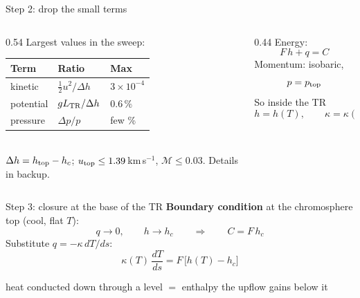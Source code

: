 \documentclass[aspectratio=169,10pt]{beamer}
\newcommand{\ptop}{p_{\rm top}}
\newcommand{\htop}{h_{\rm top}}
\newcommand{\LTR}{L_{\rm TR}}
\begin{document}
\begin{frame}{Step 2: drop the small terms}
  \begin{columns}[c]
    \begin{column}{0.54\textwidth}
      \small
      Largest values in the sweep:\\[4pt]
      \begin{tabular}{@{}lll@{}}
        \toprule
        Term & Ratio & Max \\
        \midrule
        kinetic & $\tfrac12u^2/\Delta h$ & $3\times10^{-4}$ \\
        potential & $g\LTR/\Delta h$ & $0.6\,\%$ \\
        pressure & $\Delta p/p$ & few \% \\
        \bottomrule
      \end{tabular}\\[4pt]
      \scriptsize $\Delta h = \htop - h_c$; $u_{\rm top} \leq 1.39$\,km\,s$^{-1}$,
      $\mathcal{M} \leq 0.03$. Details in backup.
    \end{column}
    \begin{column}{0.44\textwidth}
      Energy:
      \[
        F\,h + q = C
      \]
      Momentum: isobaric,
      \[
        p = \ptop
      \]
      So inside the TR
      \[
        h = h(T),\qquad \kappa = \kappa(T).
      \]
    \end{column}
  \end{columns}
\end{frame}

\begin{frame}{Step 3: closure at the base of the TR}
  \textbf{Boundary condition} at the chromosphere top (cool, flat $T$):
  \[
    q \to 0,\qquad h \to h_c
    \qquad\Longrightarrow\qquad C = F\,h_c
  \]
  \vspace{4pt}
  Substitute $q = -\kappa\,dT/ds$:
  \[
    \boxed{\ \kappa(T)\,\frac{dT}{ds} = F\,\bigl[h(T) - h_c\bigr]\ }
  \]
  \vspace{4pt}
  \begin{center}
    \small heat conducted down through a level $=$ enthalpy the upflow gains
    below it
  \end{center}
\end{frame}
\end{document}

